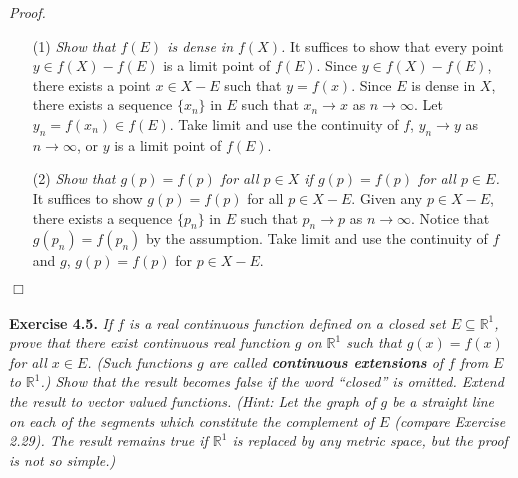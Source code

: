 \documentclass{article}
\begin{document}
\emph{Proof.}
\begin{enumerate}
\item[(1)]
\emph{Show that $f(E)$ is dense in $f(X)$.}
It suffices to show that every point $y \in f(X)-f(E)$ is a limit point of $f(E)$.
Since $y \in f(X)-f(E)$, there exists a point $x \in X-E$ such that $y = f(x)$.
Since $E$ is dense in $X$, there exists a sequence $\{x_n\}$ in $E$ such that
$x_n \to x$ as $n \to \infty$.
Let $y_n = f(x_n) \in f(E)$.
Take limit and use the continuity of $f$,
$y_n \to y$ as $n \to \infty$, or $y$ is a limit point of $f(E)$.
\item[(2)]
\emph{Show that $g(p) = f(p)$ for all $p \in X$ if $g(p) = f(p)$ for all $p \in E$.}
It suffices to show $g(p) = f(p)$ for all $p \in X-E$.
Given any $p \in X-E$, there exists a sequence $\{p_n\}$ in $E$ such that
$p_n \to p$ as $n \to \infty$.
Notice that $g(p_n) = f(p_n)$ by the assumption.
Take limit and use the continuity of $f$ and $g$,
$g(p) = f(p)$ for $p \in X-E$.
\end{enumerate}
$\Box$ \\\\






\textbf{Exercise 4.5.}
\emph{If $f$ is a real continuous function defined on a closed set $E \subseteq \mathbb{R}^1$,
prove that there exist continuous real function $g$ on $\mathbb{R}^1$ such that
$g(x) = f(x)$ for all $x \in E$.
(Such functions $g$ are called \textbf{continuous extensions} of $f$ from $E$ to $\mathbb{R}^1$.)
Show that the result becomes false if the word ``closed'' is omitted.
Extend the result to vector valued functions.
(Hint: Let the graph of $g$ be a straight line on each of the segments
which constitute the complement of $E$
(compare Exercise 2.29).
The result remains true if $\mathbb{R}^1$ is replaced by any metric space,
but the proof is not so simple.) } \\
\end{document}
